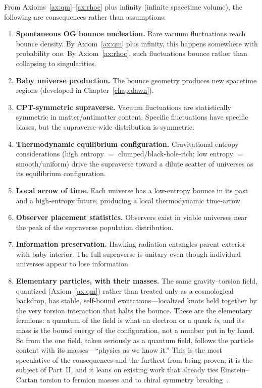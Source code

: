 From Axioms~\ref{ax:qm}--\ref{ax:rhoc} plus infinity (infinite spacetime
volume), the following are consequences rather than assumptions:

\begin{enumerate}
  \item \textbf{Spontaneous OG bounce nucleation.} Rare vacuum fluctuations reach
    bounce density. By Axiom~\ref{ax:qm} plus infinity, this happens somewhere
    with probability one. By Axiom~\ref{ax:rhoc}, such fluctuations bounce rather
    than collapsing to singularities.
  \item \textbf{Baby universe production.} The bounce geometry produces new
    spacetime regions (developed in Chapter~\ref{chap:dawn}).
  \item \textbf{CPT-symmetric supraverse.} Vacuum fluctuations are statistically
    symmetric in matter/antimatter content. Specific fluctuations have specific
    biases, but the supraverse-wide distribution is symmetric.
  \item \textbf{Thermodynamic equilibrium configuration.} Gravitational entropy
    considerations (high entropy $=$ clumped/black-hole-rich; low entropy $=$
    smooth/uniform) drive the supraverse toward a dilute scatter of universes as its
    equilibrium configuration.
  \item \textbf{Local arrow of time.} Each universe has a low-entropy bounce in
    its past and a high-entropy future, producing a local thermodynamic
    time-arrow.
  \item \textbf{Observer placement statistics.} Observers exist in viable
    universes near the peak of the supraverse population distribution.
  \item \textbf{Information preservation.} Hawking radiation entangles parent
    exterior with baby interior. The full supraverse is unitary even though
    individual universes appear to lose information.
  \item \textbf{Elementary particles, with their masses.} The same gravity--torsion
    field, quantized (Axiom~\ref{ax:qm}) rather than treated only as a cosmological
    backdrop, has stable, self-bound excitations---localized knots held together by
    the very torsion interaction that halts the bounce. These are the elementary
    fermions: a quantum of the field is what an electron or a quark \emph{is}, and its
    mass is the bound energy of the configuration, not a number put in by hand. So from
    the one field, taken seriously as a quantum field, follows the particle content
    with its masses---``physics as we know it.'' This is the most speculative of the
    consequences and the furthest from being proven; it is the subject of Part~II, and
    it leans on existing work that already ties Einstein--Cartan torsion to fermion
    masses and to chiral symmetry breaking~\citep{diether2020,tukhashvili2024}.
\end{enumerate}

